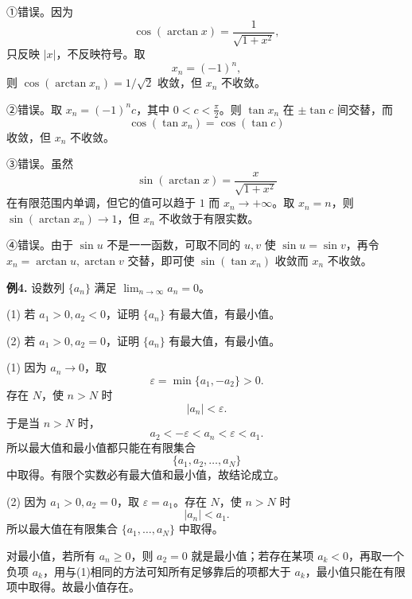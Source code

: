 \begin{solutionblock}

①错误。因为
\[
\cos(\arctan x)=\frac1{\sqrt{1+x^2}},
\]
只反映 \(|x|\)，不反映符号。取
\[
x_n=(-1)^n,
\]
则 \(\cos(\arctan x_n)=1/\sqrt2\) 收敛，但 \(x_n\) 不收敛。

②错误。取 \(x_n=(-1)^n c\)，其中 \(0<c<\frac\pi2\)。则 \(\tan x_n\) 在 \(\pm\tan c\) 间交替，而
\[
\cos(\tan x_n)=\cos(\tan c)
\]
收敛，但 \(x_n\) 不收敛。

③错误。虽然
\[
\sin(\arctan x)=\frac{x}{\sqrt{1+x^2}}
\]
在有限范围内单调，但它的值可以趋于 \(1\) 而 \(x_n\to+\infty\)。取 \(x_n=n\)，则 \(\sin(\arctan x_n)\to1\)，但 \(x_n\) 不收敛于有限实数。

④错误。由于 \(\sin u\) 不是一一函数，可取不同的 \(u,v\) 使 \(\sin u=\sin v\)，再令 \(x_n=\arctan u,\arctan v\) 交替，即可使 \(\sin(\tan x_n)\) 收敛而 \(x_n\) 不收敛。

\end{solutionblock}

\begin{problemblock}
\textbf{例4.} 设数列 \(\{a_n\}\) 满足 \(\displaystyle\lim_{n\to\infty}a_n=0\)。

(1) 若 \(a_1>0,a_2<0\)，证明 \(\{a_n\}\) 有最大值，有最小值。

(2) 若 \(a_1>0,a_2=0\)，证明 \(\{a_n\}\) 有最大值，有最小值。
\end{problemblock}

\begin{solutionblock}

(1) 因为 \(a_n\to0\)，取
\[
\varepsilon=\min\{a_1,-a_2\}>0.
\]
存在 \(N\)，使 \(n>N\) 时
\[
|a_n|<\varepsilon.
\]
于是当 \(n>N\) 时，
\[
a_2<-\varepsilon<a_n<\varepsilon<a_1.
\]
所以最大值和最小值都只能在有限集合
\[
\{a_1,a_2,\dots,a_N\}
\]
中取得。有限个实数必有最大值和最小值，故结论成立。

(2) 因为 \(a_1>0,a_2=0\)，取 \(\varepsilon=a_1\)。存在 \(N\)，使 \(n>N\) 时
\[
|a_n|<a_1.
\]
所以最大值在有限集合 \(\{a_1,\dots,a_N\}\) 中取得。

对最小值，若所有 \(a_n\ge0\)，则 \(a_2=0\) 就是最小值；若存在某项 \(a_k<0\)，再取一个负项 \(a_k\)，用与(1)相同的方法可知所有足够靠后的项都大于 \(a_k\)，最小值只能在有限项中取得。故最小值存在。

\end{solutionblock}

